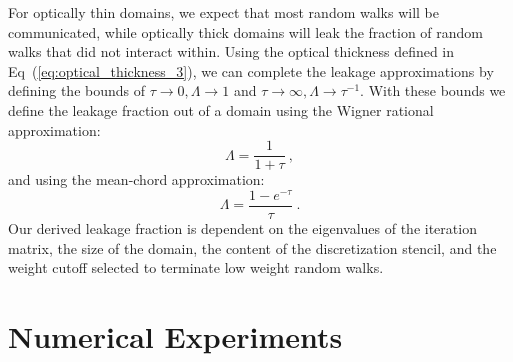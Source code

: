 \documentclass[preprint,11pt]{elsarticle}
\begin{document}
For optically thin domains, we expect that most random walks will be
communicated, while optically thick domains will leak the fraction of random
walks that did not interact within. Using the optical thickness defined in
Eq~(\ref{eq:optical_thickness_3}), we can complete the leakage approximations
by defining the bounds of $\tau \rightarrow 0, \Lambda \rightarrow 1$ and
$\tau \rightarrow \infty, \Lambda \rightarrow \tau^{-1}$.  With these bounds
we define the leakage fraction out of a domain using the Wigner rational
approximation:
\begin{equation}
  \Lambda = \frac{1}{1+\tau}\:,
  \label{eq:wigner_domain_leakage}
\end{equation}
and using the mean-chord approximation:
\begin{equation}
  \Lambda = \frac{1-e^{-\tau}}{\tau}\:.
  \label{eq:mean_chord_domain_leakage}
\end{equation}
Our derived leakage fraction is dependent on the eigenvalues of the iteration
matrix, the size of the domain, the content of the discretization stencil, and
the weight cutoff selected to terminate low weight random walks.

\section{Numerical Experiments}
\label{sec:numerical_experiments}
\end{document}
